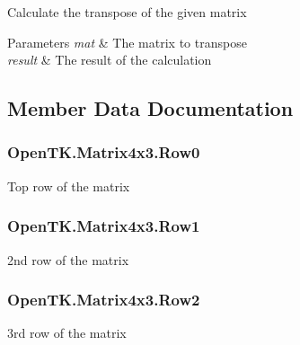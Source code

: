 Calculate the transpose of the given matrix 


\begin{DoxyParams}{Parameters}
{\em mat} & The matrix to transpose\\
\hline
{\em result} & The result of the calculation\\
\hline
\end{DoxyParams}


\subsection{Member Data Documentation}
\hypertarget{struct_open_t_k_1_1_matrix4x3_afa565d76d843dfb9867070fac7eae957}{
\subsubsection[{Row0}]{ Open\-T\-K.\-Matrix4x3.\-Row0}}\label{struct_open_t_k_1_1_matrix4x3_afa565d76d843dfb9867070fac7eae957}


Top row of the matrix 

\hypertarget{struct_open_t_k_1_1_matrix4x3_a3799713d1c249f139aa43508b15192c7}{
\subsubsection[{Row1}]{ Open\-T\-K.\-Matrix4x3.\-Row1}}\label{struct_open_t_k_1_1_matrix4x3_a3799713d1c249f139aa43508b15192c7}


2nd row of the matrix 

\hypertarget{struct_open_t_k_1_1_matrix4x3_a4287fa1551e8a526ef352fd42b4e2b4b}{
\subsubsection[{Row2}]{ Open\-T\-K.\-Matrix4x3.\-Row2}}\label{struct_open_t_k_1_1_matrix4x3_a4287fa1551e8a526ef352fd42b4e2b4b}


3rd row of the matrix 

